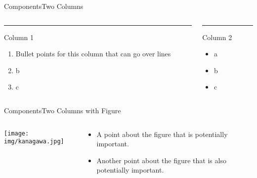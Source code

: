 \documentclass[aspectratio=43]{beamer}
\begin{document}
\begin{frame}{Components}{Two Columns}
    \begin{columns}[T]
    \vspace{0pt}
    \begin{column}{.50\textwidth}
        \vspace{0pt}
        {\color{accent}\rule{\linewidth}{2pt}}
        Column 1

        \begin{enumerate}
            \item Bullet points for this column that can go over lines
            \item b
            \item c
        \end{enumerate}

        \vspace*{50mm} %
    \end{column}
    
    \hfill
    
    \begin{column}{.50\textwidth}
        {\color{accent}\rule{\linewidth}{2pt}}
        Column 2

        \begin{itemize}
            \item a
            \item b
            \item c
        \end{itemize}
    \end{column}
    \end{columns}
\end{frame}

\begin{frame}{Components}{Two Columns with Figure}
    \begin{columns}[T]
    \vspace{0pt}
    \begin{column}{.60\textwidth}
        \texttt{[image: img/kanagawa.jpg]}

        \vspace*{50mm} %
    \end{column}
    
    \hfill
    
    \begin{column}{.40\textwidth}
        \begin{itemize}
            \item A point about the figure that is potentially important.
            \item Another point about the figure that is also potentially important.
        \end{itemize}
    \end{column}
    \end{columns}
\end{frame}
\end{document}
